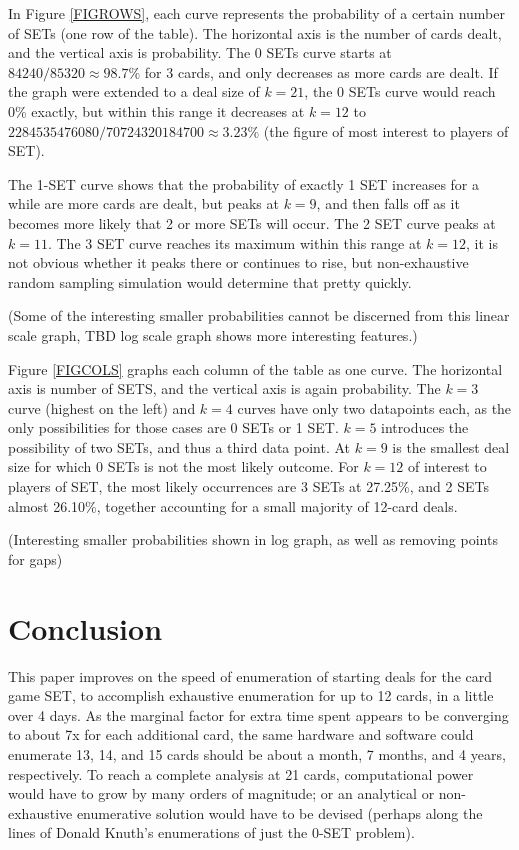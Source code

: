 \documentclass[10pt]{amsart}
\newcommand{\SET}{SET\texttrademark}  %
\begin{document}
In Figure \ref{FIGROWS}, each curve represents the probability of a certain
number of SETs (one row of the table). The horizontal axis is the number of
cards dealt, and the vertical axis is probability. The 0 SETs curve starts at
$84240/85320\approx 98.7\%$ for 3 cards, and only decreases as more cards are
dealt. If the graph were extended to a deal size of $k=21$, the 0 SETs curve
would reach $0\%$ exactly, but within this range it decreases at $k=12$ to
$2284535476080/70724320184700\approx 3.23\%$ (the figure of most interest to
players of \SET).

The 1-SET curve shows that the probability of exactly 1 SET increases for a
while are more cards are dealt, but peaks at $k=9$, and then falls off as it
becomes more likely that 2 or more SETs will occur. The 2 SET curve peaks at
$k=11$. The 3 SET curve reaches its maximum within this range at $k=12$, it is
not obvious whether it peaks there or continues to rise, but non-exhaustive
random sampling simulation would determine that pretty quickly.

(Some of the interesting smaller probabilities cannot be discerned from this
linear scale graph, TBD log scale graph shows more interesting features.)

Figure \ref{FIGCOLS} graphs each column of the table as one curve. The
horizontal axis is number of SETS, and the vertical axis is again
probability. The $k=3$ curve (highest on the left) and $k=4$ curves have only
two datapoints each, as the only possibilities for those cases are 0 SETs or 1
SET. $k=5$ introduces the possibility of two SETs, and thus a third data
point. At $k=9$ is the smallest deal size for which 0 SETs is not the most
likely outcome. For $k=12$ of interest to players of \SET, the most likely
occurrences are 3 SETs at 27.25\%, and 2 SETs almost 26.10\%, together
accounting for a small majority of 12-card deals.

(Interesting smaller probabilities shown in log graph, as well as removing
points for gaps)



\section{Conclusion}
This paper improves on the speed of enumeration of starting deals for the card
game \SET, to accomplish exhaustive enumeration for up to 12 cards, in a little
over 4 days. As the marginal factor for extra time spent appears to be
converging to about 7x for each additional card, the same hardware and software
could enumerate 13, 14, and 15 cards should be about a month, 7 months, and 4
years, respectively. To reach a complete analysis at 21 cards, computational
power would have to grow by many orders of magnitude; or an analytical or
non-exhaustive enumerative solution would have to be devised (perhaps along the
lines of Donald Knuth's enumerations of just the 0-SET problem).
\end{document}
